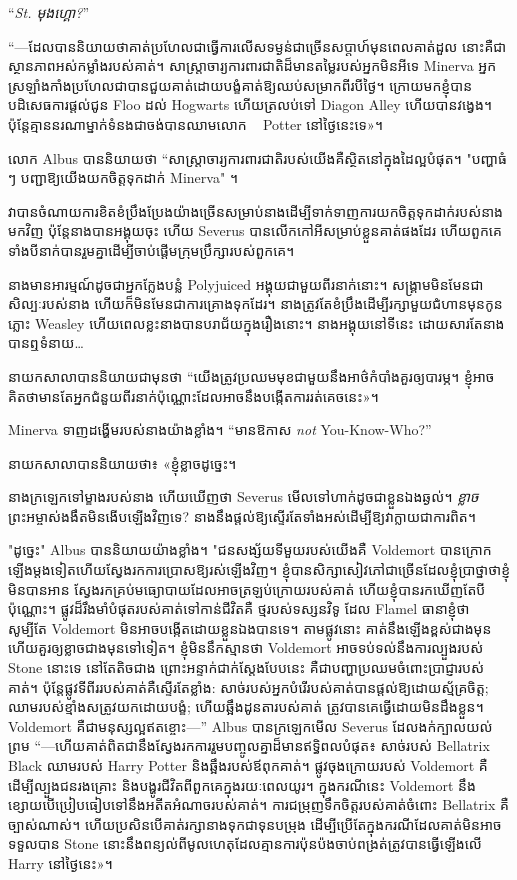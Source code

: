 “\emph{St. មុងហ្គោ?}”

“—ដែលបាននិយាយថាគាត់ប្រហែលជាធ្វើការលើសទម្ងន់ជាច្រើនសប្តាហ៍មុនពេលគាត់ដួល នោះគឺជាស្ថានភាពអស់កម្លាំងរបស់គាត់។ សាស្រ្តាចារ្យការពារជាតិដ៏មានតម្លៃរបស់អ្នកមិនអីទេ Minerva អ្នកស្រឡាំងកាំងប្រហែលជាបានជួយគាត់ដោយបង្ខំគាត់ឱ្យឈប់សម្រាកពីរបីថ្ងៃ។ ក្រោយមកខ្ញុំបានបដិសេធការផ្តល់ជូន Floo ដល់ Hogwarts ហើយត្រលប់ទៅ Diagon Alley ហើយបានវង្វេង។ ប៉ុន្តែ​គ្មាន​នរណា​ម្នាក់​ទំនង​ជា​ចង់​បាន​ឈាម​លោក ~ Potter នៅ​ថ្ងៃ​នេះ​ទេ»។

លោក Albus បាននិយាយថា “សាស្ត្រាចារ្យការពារជាតិរបស់យើងគឺស្ថិតនៅក្នុងដៃល្អបំផុត។ "បញ្ហាធំ ៗ បញ្ជាឱ្យយើងយកចិត្តទុកដាក់ Minerva" ។

វាបានចំណាយការខិតខំប្រឹងប្រែងយ៉ាងច្រើនសម្រាប់នាងដើម្បីទាក់ទាញការយកចិត្តទុកដាក់របស់នាងមកវិញ ប៉ុន្តែនាងបានអង្គុយចុះ ហើយ Severus បានលើកកៅអីសម្រាប់ខ្លួនគាត់ផងដែរ ហើយពួកគេទាំងបីនាក់បានរួមគ្នាដើម្បីចាប់ផ្តើមក្រុមប្រឹក្សារបស់ពួកគេ។

នាងមានអារម្មណ៍ដូចជាអ្នកក្លែងបន្លំ Polyjuiced អង្គុយជាមួយពីរនាក់នោះ។ សង្គ្រាមមិនមែនជាសិល្បៈរបស់នាង ហើយក៏មិនមែនជាការគ្រោងទុកដែរ។ នាងត្រូវតែខំប្រឹងដើម្បីរក្សាមួយជំហានមុនកូនភ្លោះ Weasley ហើយពេលខ្លះនាងបានបរាជ័យក្នុងរឿងនោះ។ នាង​អង្គុយ​នៅ​ទី​នេះ ដោយ​សារ​តែ​នាង​បាន​ឮ​ទំនាយ…

នាយក​សាលា​បាន​និយាយ​ជា​មុន​ថា “យើង​ត្រូវ​ប្រឈម​មុខ​ជាមួយ​នឹង​អាថ៌កំបាំង​គួរ​ឲ្យ​បារម្ភ។ ខ្ញុំ​អាច​គិត​ថា​មាន​តែ​អ្នក​ជំនួយ​ពីរ​នាក់​ប៉ុណ្ណោះ​ដែល​អាច​នឹង​បង្កើត​ការ​រត់​គេច​នេះ»។

Minerva ទាញដង្ហើមរបស់នាងយ៉ាងខ្លាំង។ “មានឱកាស \emph{not} You-Know-Who?”

នាយក​សាលា​បាន​និយាយ​ថា​៖ «​ខ្ញុំ​ខ្លាច​ដូច្នេះ​។

នាងក្រឡេកទៅម្ខាងរបស់នាង ហើយឃើញថា Severus មើលទៅហាក់ដូចជាខ្លួនឯងឆ្ងល់។ \emph{ខ្លាច} ព្រះអម្ចាស់ងងឹតមិនងើបឡើងវិញទេ? នាងនឹងផ្តល់ឱ្យស្ទើរតែទាំងអស់ដើម្បីឱ្យវាក្លាយជាការពិត។

"ដូច្នេះ" Albus បាននិយាយយ៉ាងខ្លាំង។ "ជនសង្ស័យទីមួយរបស់យើងគឺ Voldemort បានក្រោកឡើងម្តងទៀតហើយស្វែងរកការប្រោសឱ្យរស់ឡើងវិញ។ ខ្ញុំបានសិក្សាសៀវភៅជាច្រើនដែលខ្ញុំប្រាថ្នាថាខ្ញុំមិនបានអាន ស្វែងរកគ្រប់មធ្យោបាយដែលអាចត្រឡប់ក្រោយរបស់គាត់ ហើយខ្ញុំបានរកឃើញតែបីប៉ុណ្ណោះ។ ផ្លូវដ៏រឹងមាំបំផុតរបស់គាត់ទៅកាន់ជីវិតគឺ ថ្មរបស់ទស្សនវិទូ ដែល Flamel ធានាខ្ញុំថា សូម្បីតែ Voldemort មិនអាចបង្កើតដោយខ្លួនឯងបានទេ។ តាម​ផ្លូវ​នោះ គាត់​នឹង​ឡើង​ខ្ពស់​ជាង​មុន ហើយ​គួរ​ឲ្យ​ខ្លាច​ជាង​មុន​ទៅ​ទៀត។ ខ្ញុំមិននឹកស្មានថា Voldemort អាចទប់ទល់នឹងការល្បួងរបស់ Stone នោះទេ នៅតែតិចជាង ព្រោះអន្ទាក់ជាក់ស្តែងបែបនេះ គឺជាបញ្ហាប្រឈមចំពោះប្រាជ្ញារបស់គាត់។ ប៉ុន្តែផ្លូវទីពីររបស់គាត់គឺស្ទើរតែខ្លាំង: សាច់របស់អ្នកបំរើរបស់គាត់បានផ្តល់ឱ្យដោយស្ម័គ្រចិត្ត; ឈាមរបស់ខ្មាំងសត្រូវយកដោយបង្ខំ; ហើយ​ឆ្អឹង​ដូនតា​របស់​គាត់ ត្រូវ​បាន​គេ​ធ្វើ​ដោយ​មិនដឹង​ខ្លួន។ Voldemort គឺជាមនុស្សល្អឥតខ្ចោះ—” Albus បានក្រឡេកមើល Severus ដែលងក់ក្បាលយល់ព្រម “—ហើយគាត់ពិតជានឹងស្វែងរកការរួមបញ្ចូលគ្នាដ៏មានឥទ្ធិពលបំផុត៖ សាច់របស់ Bellatrix Black ឈាមរបស់ Harry Potter និងឆ្អឹងរបស់ឪពុកគាត់។ ផ្លូវចុងក្រោយរបស់ Voldemort គឺដើម្បីល្បួងជនរងគ្រោះ និងបង្ហូរជីវិតពីពួកគេក្នុងរយៈពេលយូរ។ ក្នុងករណីនេះ Voldemort នឹងខ្សោយបើប្រៀបធៀបទៅនឹងអតីតអំណាចរបស់គាត់។ ការជម្រុញទឹកចិត្តរបស់គាត់ចំពោះ Bellatrix គឺច្បាស់ណាស់។ ហើយ​ប្រសិនបើ​គាត់​រក្សា​នាង​ទុក​ជា​ទុនបម្រុង ដើម្បី​ប្រើ​តែ​ក្នុងករណី​ដែល​គាត់​មិន​អាច​ទទួលបាន Stone នោះ​នឹង​ពន្យល់​ពី​មូលហេតុ​ដែល​គ្មាន​ការប៉ុនប៉ង​ចាប់ពង្រត់​ត្រូវបាន​ធ្វើឡើង​លើ Harry នៅថ្ងៃនេះ​»​។

